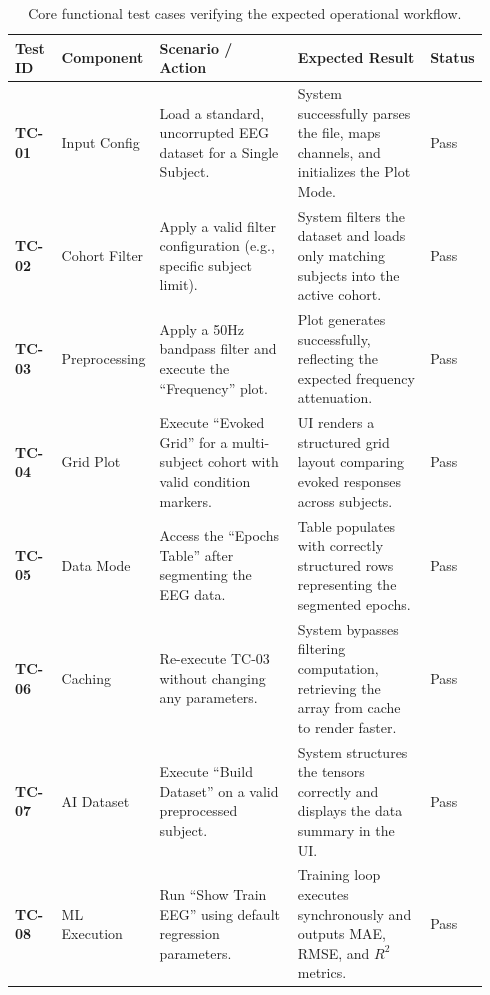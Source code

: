 \begin{table}[H]
\centering
\renewcommand{\arraystretch}{1.3}
\small
\begin{tabular}{|p{0.10\linewidth}|p{0.14\linewidth}|p{0.32\linewidth}|p{0.30\linewidth}|p{0.08\linewidth}|}
\hline
\textbf{Test ID} & \textbf{Component} & \textbf{Scenario / Action} & \textbf{Expected Result} & \textbf{Status} \\
\hline
\textbf{TC-01} & Input Config & Load a standard, uncorrupted EEG dataset for a Single Subject. & System successfully parses the file, maps channels, and initializes the Plot Mode. & Pass \\
\hline
\textbf{TC-02} & Cohort Filter & Apply a valid filter configuration (e.g., specific subject limit). & System filters the dataset and loads only matching subjects into the active cohort. & Pass \\
\hline
\textbf{TC-03} & Preprocessing & Apply a 50Hz bandpass filter and execute the ``Frequency'' plot. & Plot generates successfully, reflecting the expected frequency attenuation. & Pass \\
\hline
\textbf{TC-04} & Grid Plot & Execute ``Evoked Grid'' for a multi-subject cohort with valid condition markers. & UI renders a structured grid layout comparing evoked responses across subjects. & Pass \\
\hline
\textbf{TC-05} & Data Mode & Access the ``Epochs Table'' after segmenting the EEG data. & Table populates with correctly structured rows representing the segmented epochs. & Pass \\
\hline
\textbf{TC-06} & Caching & Re-execute TC-03 without changing any parameters. & System bypasses filtering computation, retrieving the array from cache to render faster. & Pass \\
\hline
\textbf{TC-07} & AI Dataset & Execute ``Build Dataset'' on a valid preprocessed subject. & System structures the tensors correctly and displays the data summary in the UI. & Pass \\
\hline
\textbf{TC-08} & ML Execution & Run ``Show Train EEG'' using default regression parameters. & Training loop executes synchronously and outputs MAE, RMSE, and $R^2$ metrics. & Pass \\
\hline
\end{tabular}
\vspace{0.5em}
\caption{Core functional test cases verifying the expected operational workflow.}
\label{tab:functional-test-cases}
\end{table}

